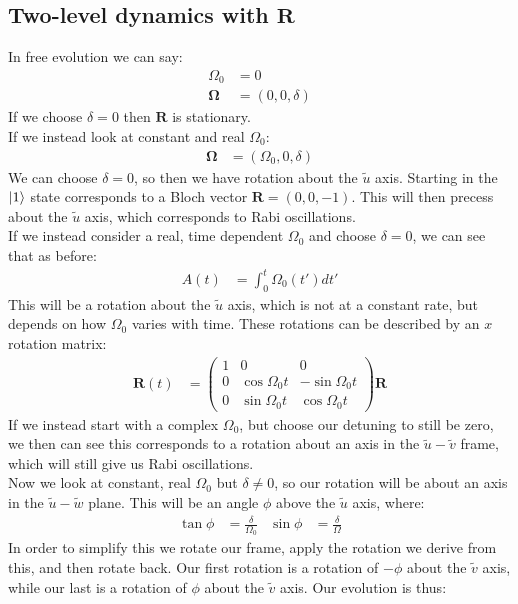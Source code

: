 \subsection{Two-level dynamics with $\bm{R}$}
In free evolution we can say:
\begin{align*}
	\Omega_0 &= 0 \\
	\bm{\Omega} &= (0,0,\delta)
\end{align*}
If we choose $\delta = 0$ then $\bm{R}$ is stationary.\\
If we instead look at constant and real $\Omega_0$:
\begin{align*}
	\bm{\Omega} &= (\Omega_0,0,\delta)
\end{align*}
We can choose $\delta = 0$, so then we have rotation about the $\tilde{u}$ axis. Starting in the $\ket{1}$ state corresponds to a Bloch vector $\bm{R} = (0,0,-1)$. This will then precess about the $\tilde{u}$ axis, which corresponds to Rabi oscillations. \\
If we instead consider a real, time dependent $\Omega_0$ and choose $\delta = 0$, we can see that as before:
\begin{align*}
	A(t) &= \int_0^t \Omega_0(t') dt'
\end{align*}
This will be a rotation about the $\tilde{u}$ axis, which is not at a constant rate, but depends on how $\Omega_0$ varies with time. These rotations can be described by an $x$ rotation matrix:
\begin{align*}
	\bm{R}(t) &= \begin{pmatrix}
		1 &0 &0 \\
		0 & \cos\Omega_0 t & -\sin\Omega_0 t \\
		0 & \sin\Omega_0t & \cos\Omega_0 t
	\end{pmatrix} \bm{R}
\end{align*}
If we instead start with a complex $\Omega_0$, but choose our detuning to still be zero, we then can see this corresponds to a rotation about an axis in the $\tilde{u}-\tilde{v}$ frame, which will still give us Rabi oscillations.\\
Now we look at constant, real $\Omega_0$ but $\delta \neq 0$, so our rotation will be about an axis in the $\tilde{u}-\tilde{w}$ plane. This will be an angle $\phi$ above the $\tilde{u}$ axis, where:
\begin{align*}
	\tan\phi &= \frac{\delta}{\Omega_0} & \sin\phi &= \frac{\delta}{\Omega}
\end{align*}
In order to simplify this we rotate our frame, apply the rotation we derive from this, and then rotate back. Our first rotation is a rotation of $-\phi$ about the $\tilde{v}$ axis, while our last is a rotation of $\phi$ about the $\tilde{v}$ axis. Our evolution is thus:
